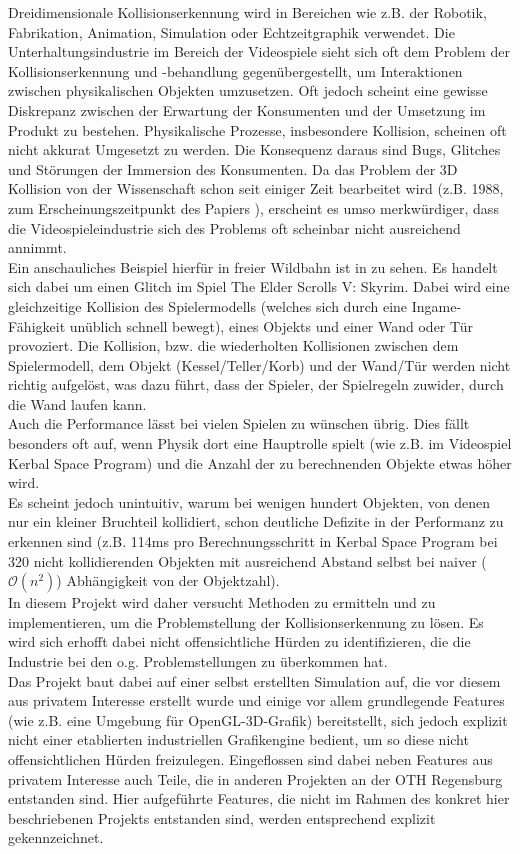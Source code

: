 
Dreidimensionale Kollisionserkennung wird in Bereichen wie z.B. der Robotik, Fabrikation, Animation, Simulation oder Echtzeitgraphik verwendet.
Die Unterhaltungsindustrie im Bereich der Videospiele sieht sich oft dem Problem der Kollisionserkennung und -behandlung gegenübergestellt, um Interaktionen zwischen physikalischen Objekten umzusetzen.
Oft jedoch scheint eine gewisse Diskrepanz zwischen der Erwartung der Konsumenten und der Umsetzung im Produkt zu bestehen. Physikalische Prozesse, insbesondere Kollision, scheinen oft nicht akkurat Umgesetzt zu werden. Die Konsequenz daraus sind Bugs, Glitches und Störungen der Immersion des Konsumenten.
Da das Problem der 3D Kollision von der Wissenschaft schon seit einiger Zeit bearbeitet wird (z.B. 1988, zum Erscheinungszeitpunkt des Papiers \cite{gjk}), erscheint es umso merkwürdiger, dass die Videospieleindustrie sich des Problems oft scheinbar nicht ausreichend annimmt.\\
Ein anschauliches Beispiel hierfür in freier Wildbahn ist in \cite{skyrimwallglitch} zu sehen. Es handelt sich dabei um einen Glitch im Spiel The Elder Scrolls V: Skyrim. Dabei wird eine gleichzeitige Kollision des Spielermodells (welches sich durch eine Ingame-Fähigkeit unüblich schnell bewegt), eines Objekts und einer Wand oder Tür provoziert. Die Kollision, bzw. die wiederholten Kollisionen zwischen dem Spielermodell, dem Objekt (Kessel/Teller/Korb) und der Wand/Tür werden nicht richtig aufgelöst, was dazu führt, dass der Spieler, der Spielregeln zuwider, durch die Wand laufen kann.\\
Auch die Performance lässt bei vielen Spielen zu wünschen übrig. Dies fällt besonders oft auf, wenn Physik dort eine Hauptrolle spielt (wie z.B. im Videospiel Kerbal Space Program) und die Anzahl der zu berechnenden Objekte etwas höher wird.\\
Es scheint jedoch unintuitiv, warum bei wenigen hundert Objekten, von denen nur ein kleiner Bruchteil kollidiert, schon deutliche Defizite in der Performanz zu erkennen sind (z.B. 114ms pro Berechnungsschritt in Kerbal Space Program bei 320 nicht kollidierenden Objekten mit ausreichend Abstand selbst bei naiver ($\mathcal{O}(n^2)$) Abhängigkeit von der Objektzahl).\\
In diesem Projekt wird daher versucht Methoden zu ermitteln und zu implementieren, um die Problemstellung der Kollisionserkennung zu lösen. Es wird sich erhofft dabei nicht offensichtliche Hürden zu identifizieren, die die Industrie bei den o.g. Problemstellungen zu überkommen hat. \\
Das Projekt baut dabei auf einer selbst erstellten Simulation auf, die vor diesem aus privatem Interesse erstellt wurde und einige vor allem grundlegende Features (wie z.B. eine Umgebung für OpenGL-3D-Grafik) bereitstellt, sich jedoch explizit nicht einer etablierten industriellen Grafikengine bedient, um so diese nicht offensichtlichen Hürden freizulegen. 
Eingeflossen sind dabei neben Features aus privatem Interesse auch Teile, die in anderen Projekten an der OTH Regensburg entstanden sind. Hier aufgeführte Features, die nicht im Rahmen des konkret hier beschriebenen Projekts entstanden sind, werden entsprechend explizit gekennzeichnet.